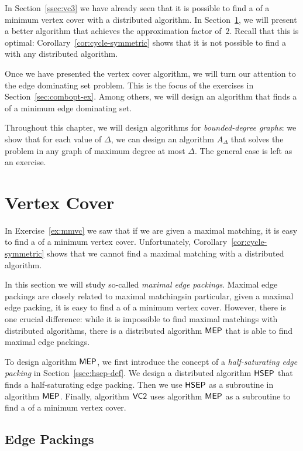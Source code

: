 In Section~\ref{ssec:vc3} we have already seen that it is possible to find a  of a minimum vertex cover with a distributed algorithm. In Section~\ref{sec:vc2}, we will present a better algorithm that achieves the approximation factor of~$2$. Recall that this is optimal: Corollary~\ref{cor:cycle-symmetric} shows that it is not possible to find a  with any distributed algorithm.

Once we have presented the vertex cover algorithm, we will turn our attention to the edge dominating set problem. This is the focus of the exercises in Section~\ref{sec:combopt-ex}. Among others, we will design an algorithm that finds a  of a minimum edge dominating set.

Throughout this chapter, we will design algorithms for \emph{bounded-degree graphs}: we show that for each value of $\Delta$, we can design an algorithm $A_\Delta$ that solves the problem in any graph of maximum degree at most $\Delta$. The general case is left as an exercise.


\section{Vertex Cover}\label{sec:vc2}

In Exercise~\ref{ex:mmvc} we saw that if we are given a maximal matching, it is easy to find a  of a minimum vertex cover. Unfortunately, Corollary~\ref{cor:cycle-symmetric} shows that we cannot find a maximal matching with a distributed algorithm.

In this section we will study so-called \emph{maximal edge packings}. Maximal edge packings are closely related to maximal matchings\mydash in particular, given a maximal edge packing, it is easy to find a  of a minimum vertex cover. However, there is one crucial difference: while it is impossible to find maximal matchings with distributed algorithms, there is a distributed algorithm $\textsf{MEP}$ that is able to find maximal edge packings.

To design algorithm $\textsf{MEP}$, we first introduce the concept of a \emph{half-saturating edge packing} in Section~\ref{ssec:hsep-def}. We design a distributed algorithm $\textsf{HSEP}$ that finds a half-saturating edge packing. Then we use $\textsf{HSEP}$ as a subroutine in algorithm $\textsf{MEP}$. Finally, algorithm $\textsf{VC2}$ uses algorithm $\textsf{MEP}$ as a subroutine to find a  of a minimum vertex cover.


\subsection{Edge Packings}

